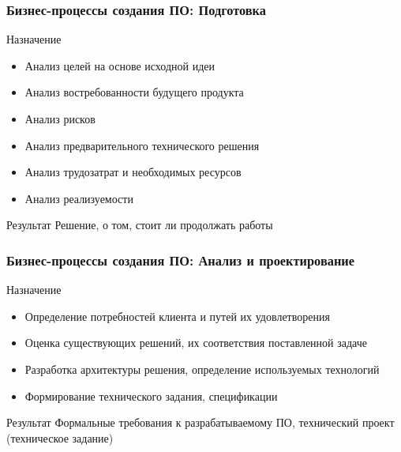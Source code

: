 \documentclass{../industrial-development}
\begin{document}
\begin{frame} \frametitle{Бизнес-процессы создания ПО: Подготовка}
	\begin{block}{Назначение}
		\begin{itemize}
			\item Анализ целей на основе исходной идеи
			\item Анализ востребованности будущего продукта
			\item Анализ рисков
			\item Анализ предварительного технического решения
			\item Анализ трудозатрат и необходимых ресурсов
			\item Анализ реализуемости
		\end{itemize}
	\end{block}
	\begin{block}{Результат}
		Решение, о том, стоит ли продолжать работы
	\end{block}
\end{frame}


\begin{frame} \frametitle{Бизнес-процессы создания ПО: Анализ и проектирование}
	\begin{block}{Назначение}
		\begin{itemize}
			\item Определение потребностей клиента и путей их удовлетворения
			\item Оценка существующих решений, их соответствия поставленной задаче
			\item Разработка архитектуры решения, определение используемых технологий
			\item Формирование технического задания, спецификации
		\end{itemize}
	\end{block}
	\begin{block}{Результат}
		Формальные требования к разрабатываемому ПО, технический проект (техническое задание)
	\end{block}
\end{frame}

\lecturenotes
\end{document}

